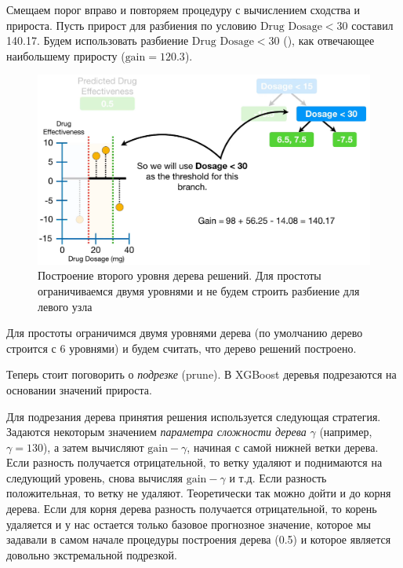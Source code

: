 \documentclass[%
	11pt,
	a4paper,
	utf8,
		]{article}
\begin{document}
Смещаем порог вправо и повторяем процедуру с вычислением сходства и прироста. Пусть прирост для разбиения по условию $ \text{Drug Dosage} < 30 $ составил 140.17. Будем использовать разбиение $ \text{Drug Dosage} < 30 $ (), как отвечающее наибольшему приросту ($ \text{gain} = 120.3 $).

\begin{figure}[h]
	\centering
	\includegraphics[scale=0.35]{figures/xgboost_best_split2.png}
	\caption{ Построение второго уровня дерева решений. Для простоты ограничиваемся двумя уровнями и не будем строить разбиение для левого узла }\label{fig:xgboost_best_split2}
\end{figure}

Для простоты ограничимся двумя уровнями дерева (по умолчанию дерево строится с 6 уровнями) и будем считать, что дерево решений построено.

Теперь стоит поговорить о \emph{подрезке} (prune). В XGBoost деревья подрезаются на основании значений прироста.


Для подрезания дерева принятия решения используется следующая стратегия. Задаются некоторым значением \emph{параметра сложности дерева} $ \gamma $ (например, $ \gamma = 130 $), а затем вычисляют $ \text{gain} - \gamma $, начиная с самой нижней ветки дерева. Если разность получается отрицательной, то ветку удаляют и поднимаются на следующий уровень, снова вычисляя $ \text{gain} - \gamma $ и т.д. Если разность положительная, то ветку не удаляют. Теоретически так можно дойти и до корня дерева. Если для корня дерева разность получается отрицательной, то корень удаляется и у нас остается только базовое прогнозное значение, которое мы задавали в самом начале процедуры построения дерева (0.5) и которое является довольно экстремальной подрезкой.
\end{document}
